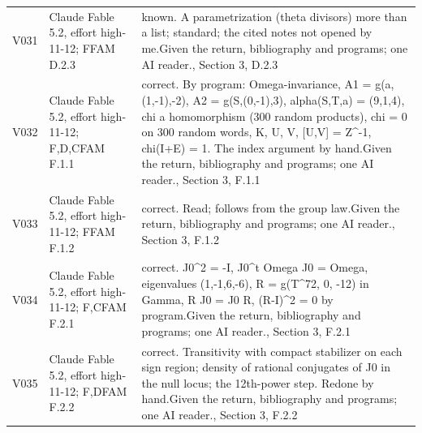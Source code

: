 \documentclass[11pt,a4paper]{article}
\theoremstyle{plain}
\theoremstyle{definition}
\begin{document}
\begin{longtable}{@{}L{.08\linewidth}L{.31\linewidth}L{.56\linewidth}@{}}
V031 & Claude Fable 5.2, effort high-11-12; F\newline FAM D.2.3 & known. A parametrization (theta divisors) more than a list; standard; the cited notes not opened by me.\newline Given the return, bibliography and programs; one AI reader.\newline {}, Section 3, D.2.3\\
V032 & Claude Fable 5.2, effort high-11-12; F,D,C\newline FAM F.1.1 & correct. By program:\allowbreak{} Omega-invariance, A1 = g(a,(1,-1),-2), A2 = g(S,(0,-1),3), alpha(S,T,a) = (9,1,4), chi a homomorphism (300 random products), chi = 0 on 300 random words, K, U, V, [U,V] = Z\textasciicircum{}-1, chi(I+E) = 1. The index argument by hand.\newline Given the return, bibliography and programs; one AI reader.\newline {}, Section 3, F.1.1\\
V033 & Claude Fable 5.2, effort high-11-12; F\newline FAM F.1.2 & correct. Read; follows from the group law.\newline Given the return, bibliography and programs; one AI reader.\newline {}, Section 3, F.1.2\\
V034 & Claude Fable 5.2, effort high-11-12; F,C\newline FAM F.2.1 & correct. J0\textasciicircum{}2 = -I, J0\textasciicircum{}t Omega J0 = Omega, eigenvalues (1,-1,6,-6), R = g(T\textasciicircum{}72, 0, -12) in Gamma, R J0 = J0 R, (R-I)\textasciicircum{}2 = 0 by program.\newline Given the return, bibliography and programs; one AI reader.\newline {}, Section 3, F.2.1\\
V035 & Claude Fable 5.2, effort high-11-12; F,D\newline FAM F.2.2 & correct. Transitivity with compact stabilizer on each sign region; density of rational conjugates of J0 in the null locus; the 12th-power step. Redone by hand.\newline Given the return, bibliography and programs; one AI reader.\newline {}, Section 3, F.2.2\\

\end{longtable}
\end{document}
